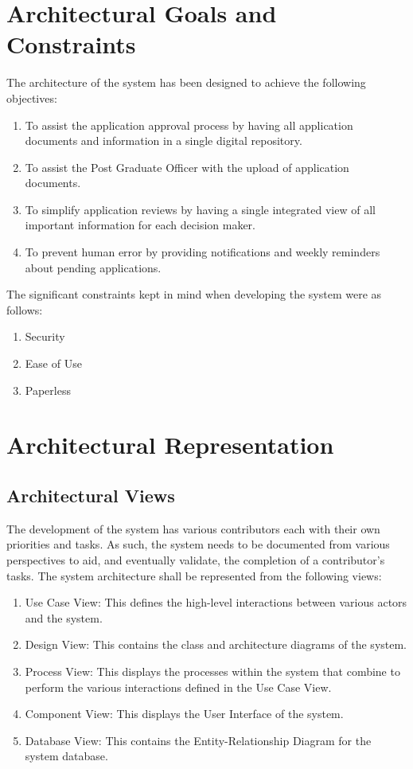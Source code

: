 \documentclass[11pt]{article}
\begin{document}
\section{Architectural Goals and Constraints}
The architecture of the system has been designed to achieve the following objectives:
\begin{enumerate}
	\item To assist the application approval process by having all application documents and information in a single digital repository.
	\item To assist the Post Graduate Officer with the upload of application documents.
	\item To simplify application reviews by having a single integrated view of all important information for each decision maker.
	\item To prevent human error by providing notifications and weekly reminders about pending applications.
	
\end{enumerate}

The significant constraints kept in mind when developing the system were as follows:

\begin{enumerate}
	\item Security
\item Ease of Use
\item Paperless
\end{enumerate}
\section{Architectural Representation}
\subsection{Architectural Views}
The development of the system has various contributors each with their own priorities and tasks. As such, the system needs to be documented from various perspectives to aid, and eventually validate, the completion of a contributor's tasks. The system architecture shall be represented from the following views:

\begin{enumerate}
\item Use Case View: This defines the high-level interactions between various actors and the system.
\item Design View: This contains the class and architecture diagrams of the system.
\item Process View: This displays the processes within the system that combine to perform the various interactions defined in the Use Case View.
\item Component View: This displays the User Interface of the system.
\item Database View: This contains the Entity-Relationship Diagram for the system database.
\end{enumerate} 
\end{document}
